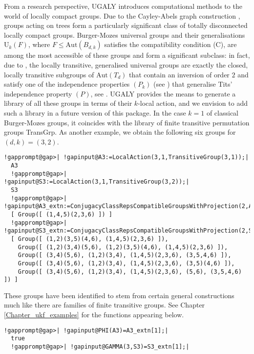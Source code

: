 \documentclass[a4paper,11pt]{report}
\begin{document}
{{ From a research perspective, \textsf{UGALY} introduces computational methods to the world of locally compact groups. Due
to the Cayley-Abels graph construction \cite{KM08}, groups acting on trees form a particularly significant class of totally
disconnected locally compact groups. Burger-Mozes universal groups \cite{BM00a} and their generalisations $\mathrm{U}_{k}(F)$, where $F\le\mathrm{Aut}(B_{d,k})$ satisfies the compatibility condition (C), are among the most accessible of
these groups and form a significant subclass: in fact, due to \cite[Corollary 4.32]{Tor20}, the locally transitive, generalised universal groups are exactly the closed,
locally transitive subgroups of $\mathrm{Aut}(T_{d})$ that contain an inversion of order $2$ and satisfy one of the independence properties $(P_{k})$ (see \cite{BEW15}) that generalise Tits' independence property $(P)$, see \cite{Tit70}. \textsf{UGALY} provides the means to generate a library of all these groups in terms of their $k$-local action, and we envision to add such a library in a future version of
this package. In the case $k=1$ of classical Burger-Mozes groups, it coincides with the library of finite
transitive permutation groups \textsf{TransGrp}. As another example, we obtain the following six groups for $(d,k)=(3,2)$. 
\begin{Verbatim}[commandchars=!@|,fontsize=\small,frame=single,label=Example]
  !gapprompt@gap>| !gapinput@A3:=LocalAction(3,1,TransitiveGroup(3,1));|
  A3
  !gapprompt@gap>| !gapinput@S3:=LocalAction(3,1,TransitiveGroup(3,2));|
  S3
  !gapprompt@gap>| !gapinput@A3_extn:=ConjugacyClassRepsCompatibleGroupsWithProjection(2,A3);|
  [ Group([ (1,4,5)(2,3,6) ]) ]
  !gapprompt@gap>| !gapinput@S3_extn:=ConjugacyClassRepsCompatibleGroupsWithProjection(2,S3);|
  [ Group([ (1,2)(3,5)(4,6), (1,4,5)(2,3,6) ]), 
    Group([ (1,2)(3,4)(5,6), (1,2)(3,5)(4,6), (1,4,5)(2,3,6) ]), 
    Group([ (3,4)(5,6), (1,2)(3,4), (1,4,5)(2,3,6), (3,5,4,6) ]), 
    Group([ (3,4)(5,6), (1,2)(3,4), (1,4,5)(2,3,6), (3,5)(4,6) ]), 
    Group([ (3,4)(5,6), (1,2)(3,4), (1,4,5)(2,3,6), (5,6), (3,5,4,6) ]) ]
\end{Verbatim}
 These groups have been identified to stem from certain general constructions
much like there are families of finite transitive groups. See Chapter \ref{Chapter_ukf_examples} for the functions appearing below. 
\begin{Verbatim}[commandchars=!@|,fontsize=\small,frame=single,label=Example]
  !gapprompt@gap>| !gapinput@PHI(A3)=A3_extn[1];|
  true
  !gapprompt@gap>| !gapinput@GAMMA(3,S3)=S3_extn[1];|

\end{Verbatim}}}
\end{document}
